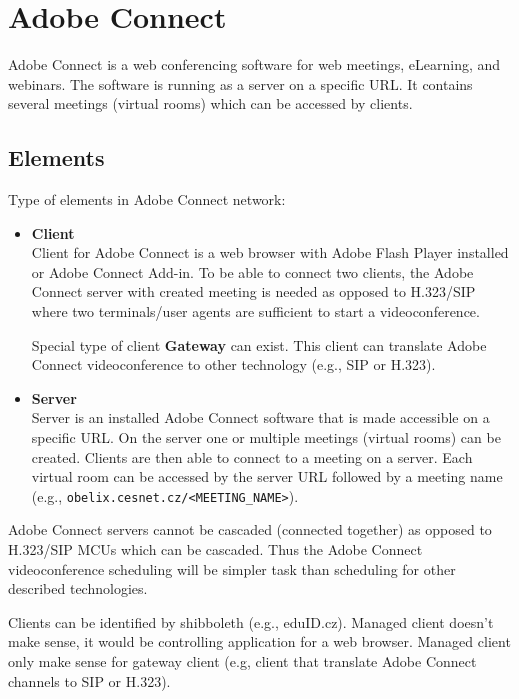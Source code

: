 \section{Adobe Connect}

Adobe Connect is a web conferencing software for web meetings, eLearning, and 
webinars. The software is running as a server on a specific URL. It contains 
several meetings (virtual rooms) which can be accessed by clients.

\subsection{Elements}

Type of elements in Adobe Connect network:

\begin{itemize}
\item \textbf{Client} \\
Client for Adobe Connect is a web browser with Adobe Flash Player installed or 
Adobe Connect Add-in. To be able to connect two clients, the Adobe Connect 
server with created meeting is needed as opposed to H.323/SIP  where two 
terminals/user agents are sufficient to start a videoconference.

Special type of client \textbf{Gateway} can exist. This client can translate 
Adobe Connect videoconference to other technology (e.g., SIP or H.323).

\item \textbf{Server} \\
Server is an installed Adobe Connect software that is made accessible on a 
specific URL. On the server one or multiple meetings (virtual rooms) can be 
created. Clients are then able to connect to a meeting on a server. Each 
virtual room can be accessed by the server URL followed by a meeting name 
(e.g., \verb|obelix.cesnet.cz/<MEETING_NAME>|).
\end{itemize}

Adobe Connect servers cannot be cascaded (connected together) as opposed to 
H.323/SIP MCUs which can be cascaded. Thus the Adobe Connect videoconference 
scheduling will be simpler task than scheduling for other described 
technologies.

Clients can be identified by shibboleth (e.g., eduID.cz). Managed client 
doesn't make sense, it would be controlling application for a web browser. 
Managed client only make sense for gateway client (e.g, client that translate 
Adobe Connect channels to SIP or H.323).

